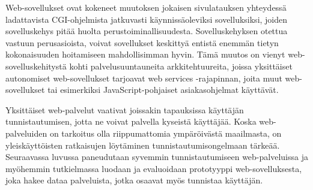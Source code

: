 Web-sovellukset ovat kokeneet muutoksen jokaisen sivulatauksen yhteydessä ladattavista CGI-ohjelmista jatkuvasti käynnissäoleviksi sovelluksiksi, joiden sovelluskehys pitää huolta perustoiminallisuudesta. Sovelluskehyksen otettua vastuun perusasioista, voivat sovellukset keskittyä entistä enemmän tietyn kokonaisuuden hoitamiseen mahdollisimman hyvin. Tämä muutos on vienyt web-sovelluskehitystä kohti palvelusuuntauneita arkkitehtuureita, joissa yksittäiset autonomiset web-sovellukset tarjoavat web services -rajapinnan, joita muut web-sovellukset tai esimerkiksi JavaScript-pohjaiset asiakasohjelmat käyttävät.

Yksittäiset web-palvelut vaativat joissakin tapauksissa käyttäjän tunnistautumisen, jotta ne voivat palvella kyseistä käyttäjää. Koska web-palveluiden on tarkoitus olla riippumattomia ympäröivästä maailmasta, on yleiskäyttöisten ratkaisujen löytäminen tunnistautumisongelmaan tärkeää. Seuraavassa luvussa paneudutaan syvemmin tunnistautumiseen web-palveluissa ja myöhemmin tutkielmassa luodaan ja evaluoidaan prototyyppi web-sovelluksesta, joka hakee dataa palveluista, jotka osaavat myös tunnistaa käyttäjän.